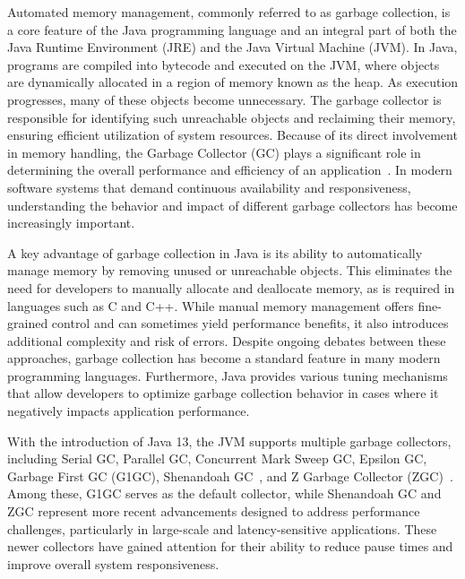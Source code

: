 Automated memory management, commonly referred to as garbage collection, is a core feature of the Java programming language and an integral part of both the Java Runtime Environment (JRE) and the Java Virtual Machine (JVM). In Java, programs are compiled into bytecode and executed on the JVM, where objects are dynamically allocated in a region of memory known as the heap. As execution progresses, many of these objects become unnecessary. The garbage collector is responsible for identifying such unreachable objects and reclaiming their memory, ensuring efficient utilization of system resources. Because of its direct involvement in memory handling, the Garbage Collector (GC) plays a significant role in determining the overall performance and efficiency of an application~\cite{carpen2015performance, lengauer2014taming}. In modern software systems that demand continuous availability and responsiveness, understanding the behavior and impact of different garbage collectors has become increasingly important.

A key advantage of garbage collection in Java is its ability to automatically manage memory by removing unused or unreachable objects. This eliminates the need for developers to manually allocate and deallocate memory, as is required in languages such as C and C++. While manual memory management offers fine-grained control and can sometimes yield performance benefits, it also introduces additional complexity and risk of errors. Despite ongoing debates between these approaches, garbage collection has become a standard feature in many modern programming languages. Furthermore, Java provides various tuning mechanisms that allow developers to optimize garbage collection behavior in cases where it negatively impacts application performance.

With the introduction of Java 13, the JVM supports multiple garbage collectors, including Serial GC, Parallel GC, Concurrent Mark Sweep GC, Epsilon GC, Garbage First GC (G1GC), Shenandoah GC~\cite{flood2016shenandoah}, and Z Garbage Collector (ZGC)~\cite{liden2018zgc}. Among these, G1GC serves as the default collector, while Shenandoah GC and ZGC represent more recent advancements designed to address performance challenges, particularly in large-scale and latency-sensitive applications. These newer collectors have gained attention for their ability to reduce pause times and improve overall system responsiveness.

